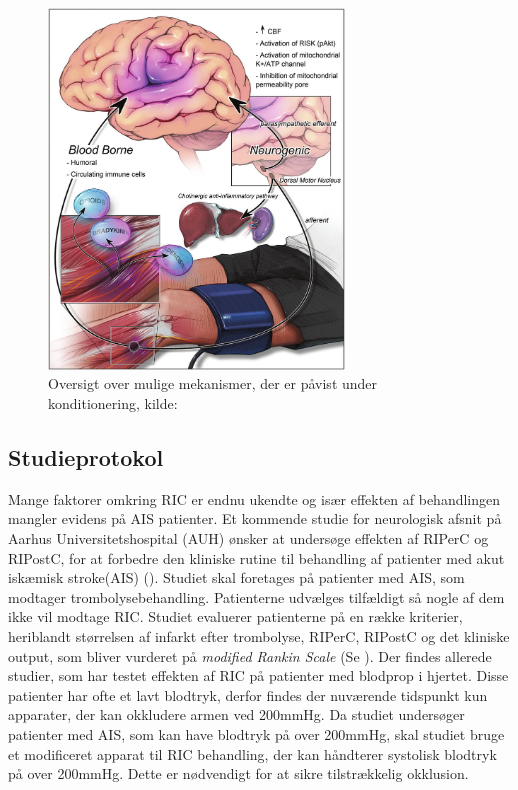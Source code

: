 \begin{figure}[H]
	\centering
	\includegraphics[width = 0.7\textwidth]{billeder/konditioneringsmekanismer.png}
	\caption{Oversigt over mulige mekanismer, der er påvist under konditionering, kilde: \cite{RefWorks:3}} \label{fig:mechanism}
\end{figure}

\subsection{Studieprotokol}\label{title:studieprotokold}
Mange faktorer omkring RIC er endnu ukendte og især effekten af behandlingen mangler evidens på AIS patienter. Et kommende studie for neurologisk afsnit på Aarhus Universitetshospital (AUH) ønsker at undersøge effekten af RIPerC og RIPostC, for at forbedre den kliniske rutine til behandling af patienter med akut iskæmisk stroke(AIS) (\cite{RefWorks:39}). Studiet skal foretages på patienter med AIS, som modtager trombolysebehandling. Patienterne udvælges tilfældigt så nogle af dem ikke vil modtage RIC. Studiet evaluerer patienterne på en række kriterier, heriblandt størrelsen af infarkt efter trombolyse, RIPerC, RIPostC og det kliniske output, som bliver vurderet på \textit{modified Rankin Scale} (Se \cite{Manual:1}). Der findes allerede studier, som har testet effekten af RIC på patienter med blodprop i hjertet. Disse patienter har ofte et lavt blodtryk, derfor findes der nuværende tidspunkt kun apparater, der kan okkludere armen ved 200mmHg. Da studiet undersøger patienter med AIS, som kan have blodtryk på over 200mmHg, skal studiet bruge et modificeret apparat til RIC behandling, der kan håndterer systolisk blodtryk på over 200mmHg. Dette er nødvendigt for at sikre tilstrækkelig okklusion.

